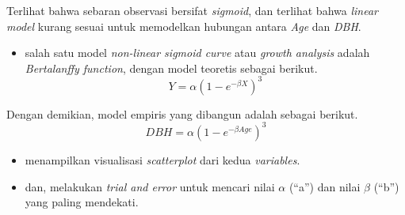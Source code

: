 \documentclass[
  12pt,
  a4paper,
]{scrbook}
\providecommand{\tightlist}{%
  \setlength{\itemsep}{0pt}\setlength{\parskip}{0pt}}
\begin{document}
Terlihat bahwa sebaran observasi bersifat \emph{sigmoid}, dan terlihat
bahwa \emph{linear model} kurang sesuai untuk memodelkan hubungan antara
\emph{Age} dan \emph{DBH}.

\begin{itemize}
\tightlist
\item
  salah satu model \emph{non-linear sigmoid curve} atau \emph{growth
  analysis} adalah \emph{Bertalanffy function}, dengan model teoretis
  sebagai berikut. \[ Y = \alpha(1-e^{-\beta X})^3 \]
\end{itemize}

Dengan demikian, model empiris yang dibangun adalah sebagai berikut.
\[ DBH = \alpha(1-e^{-\beta Age})^3 \]

\begin{itemize}
\tightlist
\item
  menampilkan visualisasi \emph{scatterplot} dari kedua
  \emph{variables}.
\item
  dan, melakukan \emph{trial and error} untuk mencari nilai \(\alpha\)
  (``a'') dan nilai \(\beta\) (``b'') yang paling mendekati.
\end{itemize}
\end{document}
